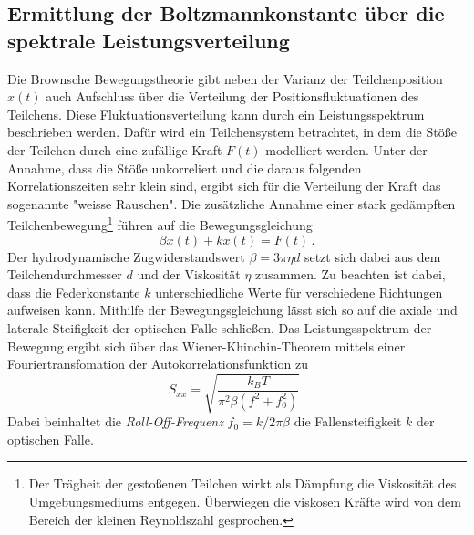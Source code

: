 \subsection{Ermittlung der Boltzmannkonstante über die spektrale Leistungsverteilung}
Die Brownsche Bewegungstheorie gibt neben der Varianz der Teilchenposition $x(t)$ auch Aufschluss über die Verteilung der Positionsfluktuationen des Teilchens. Diese Fluktuationsverteilung kann durch ein Leistungsspektrum beschrieben werden. Dafür wird ein Teilchensystem betrachtet, in dem die Stöße der Teilchen durch eine zufällige Kraft $F(t)$ modelliert werden.
Unter der Annahme, dass die Stöße unkorreliert und die daraus folgenden Korrelationszeiten sehr klein sind, ergibt sich für die Verteilung der Kraft das sogenannte "weisse Rauschen". Die zusätzliche Annahme einer stark gedämpften Teilchenbewegung\footnote{Der Trägheit der gestoßenen Teilchen wirkt als Dämpfung die Viskosität des Umgebungsmediums entgegen. Überwiegen die viskosen Kräfte wird von dem Bereich der kleinen Reynoldszahl gesprochen.} führen auf die Bewegungsgleichung
\begin{equation}
  \beta \dot x(t) + kx(t) = F(t)\, .
\end{equation}
Der hydrodynamische Zugwiderstandswert $\beta = 3\pi\eta d $ setzt sich dabei aus dem Teilchendurchmesser $d$ und der Viskosität $\eta$ zusammen. Zu beachten ist dabei, dass die Federkonstante $k$ unterschiedliche Werte für verschiedene Richtungen aufweisen kann. Mithilfe der Bewegungsgleichung lässt sich so auf die axiale und laterale Steifigkeit der optischen Falle schließen.
Das Leistungsspektrum der Bewegung ergibt sich über das Wiener-Khinchin-Theorem mittels einer Fouriertransfomation der Autokorrelationsfunktion zu
\begin{equation}
  S_{xx} = \sqrt{\frac{k_B T}{\pi^2\beta ( f^2 + f_0^2)}}\, .
\end{equation}
Dabei beinhaltet die \textit{Roll-Off-Frequenz} $f_0 = k / 2\pi\beta$ die Fallensteifigkeit $k$ der optischen Falle. \cite{MIT}\cite{Brown}\\

